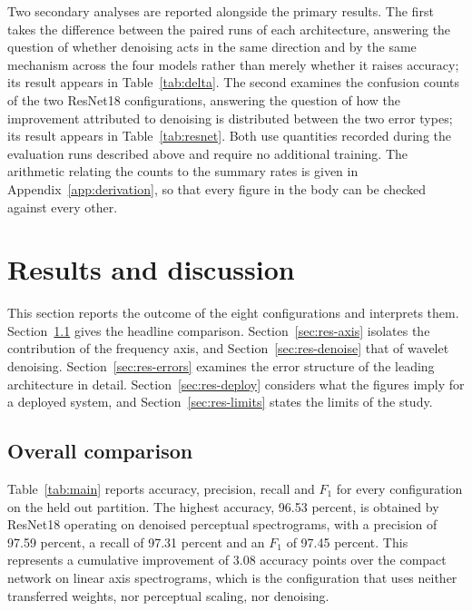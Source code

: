 \documentclass[pdflatex,sn-mathphys-num]{sn-jnl}
\begin{document}
Two secondary analyses are reported alongside the primary results. The first
takes the difference between the paired runs of each architecture, answering
the question of whether denoising acts in the same direction and by the same
mechanism across the four models rather than merely whether it raises
accuracy; its result appears in Table~\ref{tab:delta}. The second examines
the confusion counts of the two ResNet18 configurations, answering the
question of how the improvement attributed to denoising is distributed
between the two error types; its result appears in Table~\ref{tab:resnet}.
Both use quantities recorded during the
evaluation runs described above and require no additional training. The
arithmetic relating the counts to the summary rates is given in
Appendix~\ref{app:derivation}, so that every figure in the body can be
checked against every other.

\section{Results and discussion}\label{sec:results}

This section reports the outcome of the eight configurations and interprets
them. Section~\ref{sec:res-overall} gives the headline comparison.
Section~\ref{sec:res-axis} isolates the contribution of the frequency axis,
and Section~\ref{sec:res-denoise} that of wavelet denoising.
Section~\ref{sec:res-errors} examines the error structure of the leading
architecture in detail. Section~\ref{sec:res-deploy} considers what the
figures imply for a deployed system, and Section~\ref{sec:res-limits} states
the limits of the study.

\subsection{Overall comparison}\label{sec:res-overall}

Table~\ref{tab:main} reports accuracy, precision, recall and $F_1$ for every
configuration on the held out partition. The highest accuracy, 96.53 percent,
is obtained by ResNet18 operating on denoised perceptual spectrograms, with a
precision of 97.59 percent, a recall of 97.31 percent and an $F_1$ of 97.45
percent. This represents a cumulative improvement of 3.08 accuracy points over
the compact network on linear axis spectrograms, which is the configuration
that uses neither transferred weights, nor perceptual scaling, nor denoising.
\end{document}
